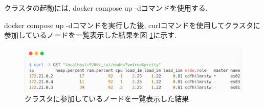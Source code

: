 



クラスタの起動には, docker compose up -dコマンドを使用する.

docker compose up -dコマンドを実行した後, curlコマンドを使用してクラスタに参加しているノードを一覧表示した結果を図 \ref{4-p4}に示す.

\begin{figure}[H]
  \begin{center}
    \includegraphics[width=140mm]{sotu/figure/curl-same.png}
    \caption{クラスタに参加しているノードを一覧表示した結果}
    \label{4-p4}
  \end{center}
\end{figure}

